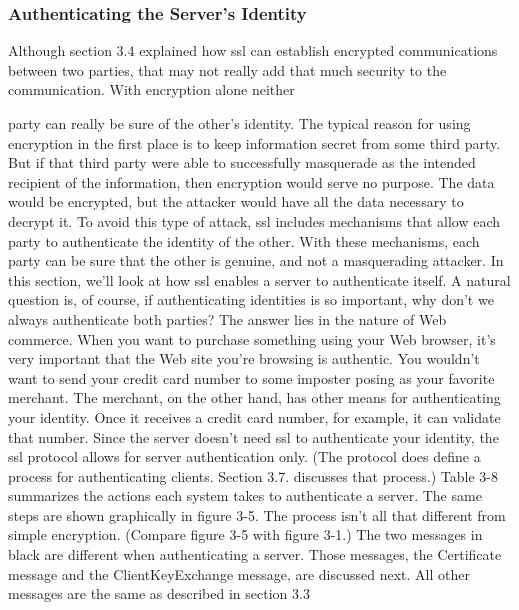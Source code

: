 \subsubsection{Authenticating the Server’s Identity}
Although section 3.4 explained how ssl can establish encrypted
communications between two parties, that may not really add that
much security to the communication. With encryption alone neither

party can really be sure of the other’s identity. The typical reason for
using encryption in the first place is to keep information secret from
some third party. But if that third party were able to successfully
masquerade as the intended recipient of the information, then encryption would serve no purpose. The data would be encrypted, but
the attacker would have all the data necessary to decrypt it.
To avoid this type of attack, ssl includes mechanisms that allow each
party to authenticate the identity of the other. With these mechanisms, each party can be sure that the other is genuine, and not a
masquerading attacker. In this section, we’ll look at how ssl enables a
server to authenticate itself.
A natural question is, of course, if authenticating identities is so important, why don’t we always authenticate both parties? The answer
lies in the nature of Web commerce. When you want to purchase
something using your Web browser, it’s very important that the Web
site you’re browsing is authentic. You wouldn’t want to send your
credit card number to some imposter posing as your favorite merchant. The merchant, on the other hand, has other means for
authenticating your identity. Once it receives a credit card number,
for example, it can validate that number. Since the server doesn’t
need ssl to authenticate your identity, the ssl protocol allows for
server authentication only. (The protocol does define a process for
authenticating clients. Section 3.7. discusses that process.)
Table 3-8 summarizes the actions each system takes to authenticate a
server. The same steps are shown graphically in figure 3-5. The process isn’t all that different from simple encryption. (Compare figure
3-5 with figure 3-1.) The two messages in black are different when authenticating a server. Those messages, the Certificate message and
the ClientKeyExchange message, are discussed next. All other messages are the same as described in section 3.3

